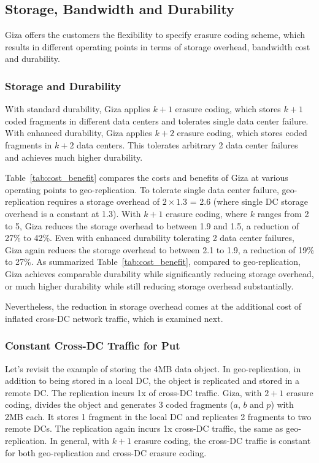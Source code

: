 \subsection{Storage, Bandwidth and Durability}
\label{subsec:trade-off}

Giza offers the customers the flexibility to specify erasure coding scheme, which results in different operating points in terms of storage overhead, bandwidth cost and durability.

\subsubsection{Storage and Durability}

With standard durability, Giza applies $k+1$ erasure coding, which stores $k+1$ coded fragments in different data centers and tolerates single data center failure. With enhanced durability, Giza applies $k+2$ erasure coding, which stores coded fragments in $k+2$ data centers. This tolerates arbitrary 2 data center failures and achieves much higher durability. 

Table~\ref{tab:cost_benefit} compares the costs and benefits of Giza at various operating points to geo-replication.
To tolerate single data center failure, geo-replication requires a storage overhead of $2\times1.3$ = 2.6 (where single DC storage overhead is a constant at 1.3). With $k+1$ erasure coding, where $k$ ranges from 2 to 5, Giza reduces the storage overhead to between 1.9 and 1.5, a reduction of 27\% to 42\%. Even with enhanced durability tolerating 2 data center failures, Giza again reduces the storage overhead to between 2.1 to 1.9, a reduction of 19\% to 27\%. As summarized Table~\ref{tab:cost_benefit}, compared to geo-replication, Giza achieves comparable durability while significantly reducing storage overhead, or much higher durability while still reducing storage overhead substantially.

Nevertheless, the reduction in storage overhead comes at the additional cost of inflated cross-DC network traffic, which is examined next.

\subsubsection{Constant Cross-DC Traffic for Put}

Let's revisit the example of storing the 4MB data object. In geo-replication, in addition to being stored in a local DC, the object is replicated and stored in a remote DC. The replication incurs 1x of cross-DC traffic. Giza, with $2 + 1$ erasure coding, divides the object  and generates 3 coded fragments ($a$, $b$ and $p$) with 2MB each. It stores 1 fragment in the local DC and replicates 2 fragments to two remote DCs. The replication again incurs 1x cross-DC traffic, the same as geo-replication. In general, with $k+1$ erasure coding, the cross-DC traffic is constant for both geo-replication and cross-DC erasure coding.

